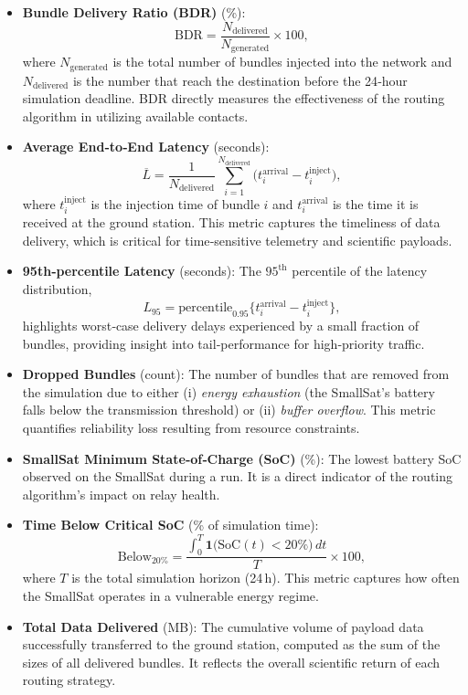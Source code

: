 \documentclass[a4paper,fleqn]{cas-dc}
\begin{document}
\begin{itemize}
  \item \textbf{Bundle Delivery Ratio (BDR)} (\%):
        \begin{equation}
          \text{BDR}
          = \frac{N_{\text{delivered}}}{N_{\text{generated}}}\times 100,
        \end{equation}
        where $N_{\text{generated}}$ is the total number of bundles injected into the network and $N_{\text{delivered}}$ is the number that reach the destination before the 24‑hour simulation deadline. BDR directly measures the effectiveness of the routing algorithm in utilizing available contacts.
  \item \textbf{Average End‑to‑End Latency} (seconds):
        \begin{equation}
          \overline{L}
          = \frac{1}{N_{\text{delivered}}}
            \sum_{i=1}^{N_{\text{delivered}}}
            \bigl(t^{\text{arrival}}_{i} - t^{\text{inject}}_{i}\bigr),
        \end{equation}
        where $t^{\text{inject}}_{i}$ is the injection time of bundle $i$ and $t^{\text{arrival}}_{i}$ is the time it is received at the ground station. This metric captures the timeliness of data delivery, which is critical for time‑sensitive telemetry and scientific payloads.
  \item \textbf{95th‑percentile Latency} (seconds):
        The $95^{\text{th}}$ percentile of the latency distribution,
        \[
          L_{95} = \text{percentile}_{0.95}\bigl\{t^{\text{arrival}}_{i} - t^{\text{inject}}_{i}\bigr\},
        \]
        highlights worst‑case delivery delays experienced by a small fraction of bundles, providing insight into tail‑performance for high‑priority traffic.
  \item \textbf{Dropped Bundles} (count):
        The number of bundles that are removed from the simulation due to either (i) \emph{energy exhaustion} (the SmallSat’s battery falls below the transmission threshold) or (ii) \emph{buffer overflow}. This metric quantifies reliability loss resulting from resource constraints.
  \item \textbf{SmallSat Minimum State‑of‑Charge (SoC)} (\%):
        The lowest battery SoC observed on the SmallSat during a run. It is a direct indicator of the routing algorithm’s impact on relay health.
  \item \textbf{Time Below Critical SoC} (\% of simulation time):
        \begin{equation}
          \text{Below}_{20\%}
          = \frac{\displaystyle\int_{0}^{T}
                 \mathbf{1}\bigl(\text{SoC}(t) < 20\%\bigr)\,dt}
                 {T}\times 100,
        \end{equation}
        where $T$ is the total simulation horizon (24 h). This metric captures how often the SmallSat operates in a vulnerable energy regime.
  \item \textbf{Total Data Delivered} (MB):
        The cumulative volume of payload data successfully transferred to the ground station, computed as the sum of the sizes of all delivered bundles. It reflects the overall scientific return of each routing strategy.
\end{itemize}
\end{document}
